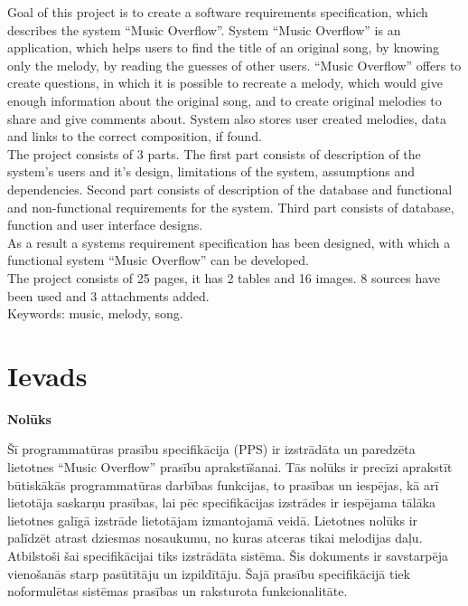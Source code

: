 \documentclass[12pt]{article}
\begin{document}
Goal of this project is to create a software requirements specification, which describes the system ``Music Overflow''. System ``Music Overflow'' is an application, which helps users to find the title of an original song, by knowing only the melody, by reading the guesses of other users. ``Music Overflow'' offers to create questions, in which it is possible to recreate a melody, which would give enough information about the original song, and to create original melodies to share and give comments about. System also stores user created melodies, data and links to the correct composition, if found.\\
\indent The project consists of 3 parts. The first part consists of description of the system's users and it's design, limitations of the system, assumptions and dependencies. Second part consists of description of the database and functional and non-functional requirements for the system. Third part consists of database, function and user interface designs.\\
\indent As a result a systems requirement specification has been designed, with which a functional system ``Music Overflow'' can be developed.\\
\indent The project consists of 25 pages, it has 2 tables and 16 images. 8 sources have been used and 3 attachments added.\\
\indent Keywords: music, melody, song.

\pagebreak

\tableofcontents

\pagebreak

\section*{Ievads}

\textbf{Nolūks}

Šī programmatūras prasību specifikācija (PPS) ir izstrādāta un paredzēta lietotnes ``Music Overflow'' prasību aprakstīšanai.
Tās nolūks ir precīzi aprakstīt būtiskākās programmatūras darbības funkcijas, to prasības un iespējas, kā arī lietotāja saskarņu prasības, lai pēc specifikācijas izstrādes ir iespējama tālāka lietotnes galīgā izstrāde lietotājam izmantojamā veidā.
Lietotnes nolūks ir palīdzēt atrast dziesmas nosaukumu, no kuras atceras tikai melodijas daļu.
Atbilstoši šai specifikācijai tiks izstrādāta sistēma. Šis dokuments ir savstarpēja vienošanās starp pasūtītāju un izpildītāju. Šajā prasību specifikācijā tiek noformulētas sistēmas prasības un raksturota funkcionalitāte.
\end{document}
